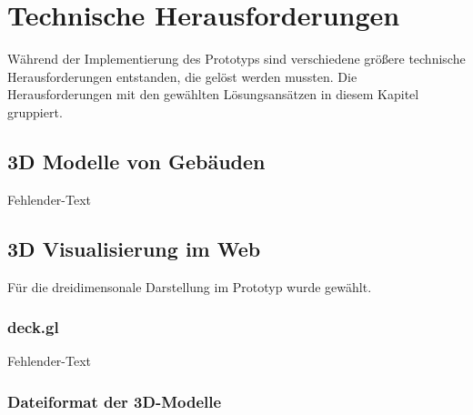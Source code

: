 \newpage
\section{Technische Herausforderungen}
Während der Implementierung des Prototyps sind verschiedene größere technische Herausforderungen entstanden, die gelöst werden mussten. Die Herausforderungen mit den gewählten Lösungsansätzen in diesem Kapitel gruppiert. 

\subsection{3D Modelle von Gebäuden}
Fehlender-Text

\subsection{3D Visualisierung im Web}
Für die dreidimensonale Darstellung im Prototyp wurde \deckgl{} gewählt.

\subsubsection{deck.gl}
Fehlender-Text

\subsubsection{Dateiformat der 3D-Modelle}\label{sec:ModelFileFormat}

